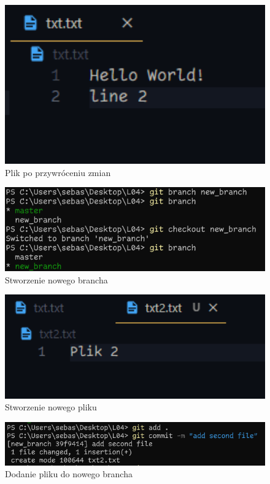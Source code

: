\documentclass{article} %
\begin{document}
\begin{figure}[h]
	\centering
	\includegraphics[width=1\textwidth]{image/git/13.png}
	\caption{Plik po przywróceniu zmian}
\end{figure}

\begin{figure}[h]
	\centering
	\includegraphics[width=1\textwidth]{image/git/14.png}
	\caption{Stworzenie nowego brancha}
\end{figure}

\begin{figure}[h]
	\centering
	\includegraphics[width=1\textwidth]{image/git/15.png}
	\caption{Stworzenie nowego pliku}
\end{figure}

\begin{figure}[h]
	\centering
	\includegraphics[width=1\textwidth]{image/git/16.png}
	\caption{Dodanie pliku do nowego brancha}
\end{figure}
\end{document}
